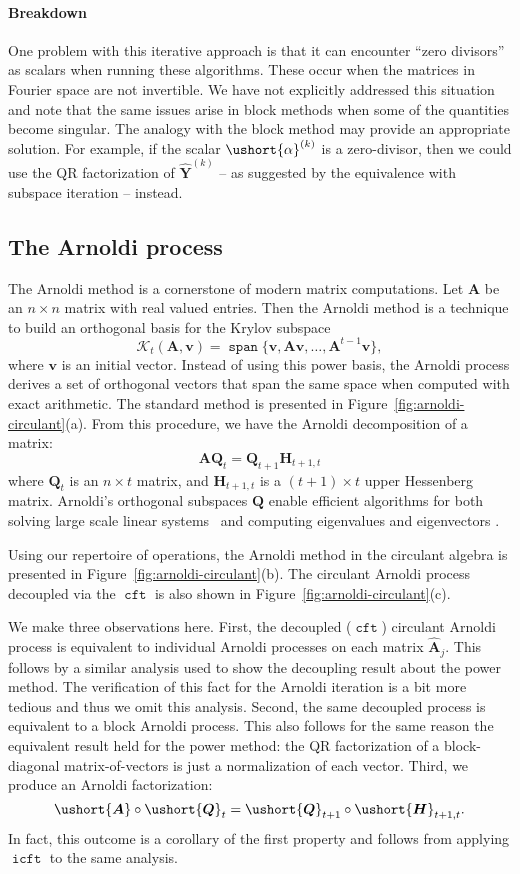 \documentclass[1p,authoryear,letterpaper]{elsarticle}
\renewcommand{\cite}{\citep}
\DeclareMathOperator{\tspan}{\texttt{span}}
\providecommand{\itn}[1]{^{(#1)}}\providecommand{\cardof}[1]{\left| #1 \right|}
\providecommand{\mat}{\boldsymbol}
\renewcommand{\vec}{\mathbf}
\providecommand{\mA}{\ensuremath{\mat{A}}}
\providecommand{\mH}{\ensuremath{\mat{H}}}
\providecommand{\mQ}{\ensuremath{\mat{Q}}}
\providecommand{\mhat}[1]{\ensuremath{\mat{\hat{#1}}}}
\providecommand{\mAhat}{\mhat{A}}
\providecommand{\vv}{\ensuremath{\vec{v}}}
\DeclareMathOperator{\icft}{\texttt{icft}}
\DeclareMathOperator{\cft}{\texttt{cft}}
\newcommand{\cel}[1]{\ushort{#1}}
\newcommand{\celm}[1]{\cel{\mat{#1}}}
\newcommand{\calpha}{\ensuremath{\cel{\alpha}}}
\providecommand{\cmA}{\ensuremath{\celm{A}}}
\providecommand{\cmH}{\ensuremath{\celm{H}}}
\providecommand{\cmQ}{\ensuremath{\celm{Q}}}
\newcommand{\mYhat}{\mat{\hat{Y}}}
\begin{document}
\paragraph{Breakdown}

One problem with this
iterative approach is that it can
encounter ``zero divisors'' as scalars when
running these algorithms.  These occur when the
matrices in Fourier space are not invertible.
We have not explicitly
addressed this situation and note that the same issues arise
in block methods when some of the quantities
become singular.  The analogy
with the block method may provide an appropriate
solution.  For example, if the scalar $\calpha\itn{k}$
is a zero-divisor, then we could use the QR factorization
of $\mYhat\itn{k}$ -- as suggested by the equivalence
with subspace iteration -- instead. 

\subsection{The Arnoldi process}

The Arnoldi method is a cornerstone of modern matrix computations.
Let $\mA$ be an $n \times n$ matrix with real valued entries.
Then the Arnoldi method is a technique to build an orthogonal
basis for the Krylov subspace
\[
 \mathcal{K}_t(\mA,\vv) = \tspan\{ \vv, \mA \vv, \ldots, \mA^{t-1} \vv \} ,
\]
where $\vv$ is an initial vector.
Instead of using this power basis, the Arnoldi
process derives a set of orthogonal vectors that span the same space
when computed with exact arithmetic.  The standard method is
presented in Figure~\ref{fig:arnoldi-circulant}(a).
From this procedure, we have the Arnoldi decomposition of a matrix:
\[ \mA \mQ_t = \mQ_{t+1} \mH_{t+1,t} \]
where $\mQ_t$ is an $n \times t$ matrix, and $\mH_{t+1,t}$ is a $(t+1) \times t$
upper Hessenberg matrix.
Arnoldi's orthogonal subspaces $\mQ$ enable efficient algorithms for both
solving large scale linear systems~\cite{Krylov1931-equations} and computing eigenvalues and
eigenvectors \cite{Arnoldi1951-minimized}.

Using our repertoire of operations, the Arnoldi
method in the circulant algebra is presented in
Figure~\ref{fig:arnoldi-circulant}(b).  The circulant Arnoldi process decoupled
via the $\cft$ is also shown in Figure~\ref{fig:arnoldi-circulant}(c).

We make three observations here.
First, the decoupled ($\cft$) circulant Arnoldi process
is equivalent to individual Arnoldi processes on each matrix $\mAhat_j$.
This follows by a similar analysis used to
show the decoupling result about the power method.
The verification
of this fact for the Arnoldi iteration is a bit more tedious and thus
we omit this analysis.
Second, the same decoupled process
is equivalent to a block Arnoldi process.
This also follows for the same
reason the equivalent result held for the power method: the QR
factorization of a block-diagonal matrix-of-vectors is just
a normalization of each vector.
Third,
we produce an Arnoldi factorization:
\[ \cmA \circ \cmQ_{t} = \cmQ_{t+1} \circ \cmH_{t+1,t}. \]
In fact, this outcome is a corollary of the first property
and follows from applying $\icft$ to the same analysis.
\end{document}
